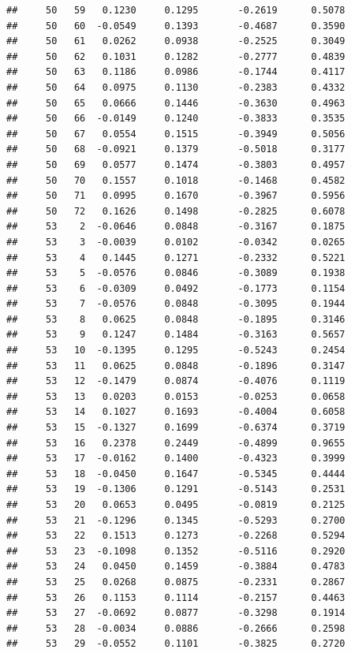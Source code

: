 \documentclass[
]{article}
\begin{document}
\begin{verbatim}
##     50   59   0.1230     0.1295       -0.2619      0.5078  
##     50   60  -0.0549     0.1393       -0.4687      0.3590  
##     50   61   0.0262     0.0938       -0.2525      0.3049  
##     50   62   0.1031     0.1282       -0.2777      0.4839  
##     50   63   0.1186     0.0986       -0.1744      0.4117  
##     50   64   0.0975     0.1130       -0.2383      0.4332  
##     50   65   0.0666     0.1446       -0.3630      0.4963  
##     50   66  -0.0149     0.1240       -0.3833      0.3535  
##     50   67   0.0554     0.1515       -0.3949      0.5056  
##     50   68  -0.0921     0.1379       -0.5018      0.3177  
##     50   69   0.0577     0.1474       -0.3803      0.4957  
##     50   70   0.1557     0.1018       -0.1468      0.4582  
##     50   71   0.0995     0.1670       -0.3967      0.5956  
##     50   72   0.1626     0.1498       -0.2825      0.6078  
##     53    2  -0.0646     0.0848       -0.3167      0.1875  
##     53    3  -0.0039     0.0102       -0.0342      0.0265  
##     53    4   0.1445     0.1271       -0.2332      0.5221  
##     53    5  -0.0576     0.0846       -0.3089      0.1938  
##     53    6  -0.0309     0.0492       -0.1773      0.1154  
##     53    7  -0.0576     0.0848       -0.3095      0.1944  
##     53    8   0.0625     0.0848       -0.1895      0.3146  
##     53    9   0.1247     0.1484       -0.3163      0.5657  
##     53   10  -0.1395     0.1295       -0.5243      0.2454  
##     53   11   0.0625     0.0848       -0.1896      0.3147  
##     53   12  -0.1479     0.0874       -0.4076      0.1119  
##     53   13   0.0203     0.0153       -0.0253      0.0658  
##     53   14   0.1027     0.1693       -0.4004      0.6058  
##     53   15  -0.1327     0.1699       -0.6374      0.3719  
##     53   16   0.2378     0.2449       -0.4899      0.9655  
##     53   17  -0.0162     0.1400       -0.4323      0.3999  
##     53   18  -0.0450     0.1647       -0.5345      0.4444  
##     53   19  -0.1306     0.1291       -0.5143      0.2531  
##     53   20   0.0653     0.0495       -0.0819      0.2125  
##     53   21  -0.1296     0.1345       -0.5293      0.2700  
##     53   22   0.1513     0.1273       -0.2268      0.5294  
##     53   23  -0.1098     0.1352       -0.5116      0.2920  
##     53   24   0.0450     0.1459       -0.3884      0.4783  
##     53   25   0.0268     0.0875       -0.2331      0.2867  
##     53   26   0.1153     0.1114       -0.2157      0.4463  
##     53   27  -0.0692     0.0877       -0.3298      0.1914  
##     53   28  -0.0034     0.0886       -0.2666      0.2598  
##     53   29  -0.0552     0.1101       -0.3825      0.2720  

\end{verbatim}
\end{document}
